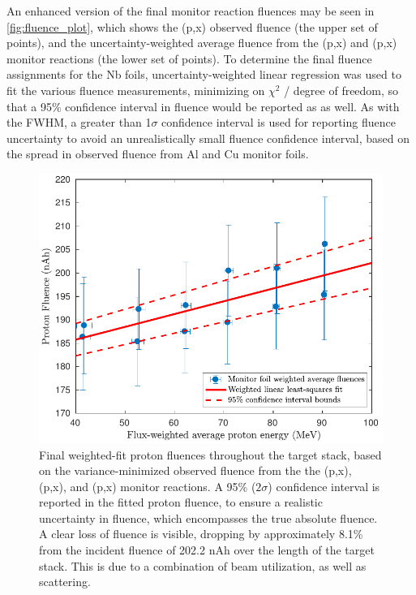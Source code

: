 \documentclass[3p]{elsarticle}
\begin{document}
An enhanced version of the final monitor reaction fluences may be seen in \autoref{fig:fluence_plot}, which shows the  (p,x) observed fluence (the upper set of points), and the uncertainty-weighted average fluence from the  (p,x) and (p,x) monitor reactions (the lower set of points).
To determine the final fluence assignments for the Nb foils, uncertainty-weighted linear regression was used to fit the various fluence measurements, minimizing on $\chi^2$ / degree of freedom, so that  a 95\% confidence interval in fluence would be reported as as well.
As with the FWHM, a greater than 1$\sigma$ confidence interval is used for reporting fluence uncertainty to avoid an unrealistically small fluence confidence interval, based on the spread in observed fluence from Al and Cu monitor foils.



\begin{figure}
 \centering
 \includegraphics[scale=.8]{./figures/fluence_plot.pdf}
 \caption{Final weighted-fit proton fluences throughout the target stack, based on the variance-minimized observed fluence from the the  (p,x), (p,x), and (p,x) monitor reactions. A 95\% ($2\sigma$) confidence interval is reported in the fitted proton fluence, to ensure a realistic uncertainty in fluence, which encompasses the true absolute fluence. A clear loss of fluence  is visible, dropping by approximately 8.1\% from the incident fluence of 202.2 nAh over the length of the target stack.  This is due to a combination of beam utilization, as well as scattering.}
 \label{fig:fluence_plot}
\end{figure}
\end{document}
